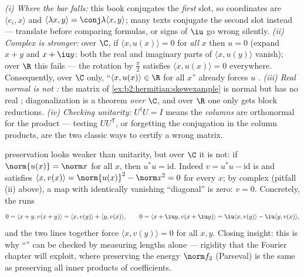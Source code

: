 \begin{remark}
\emph{(i) Where the bar falls:} this book conjugates the
\emph{first} slot, so coordinates are $\langle e_i, x\rangle$
and $\langle\lambda x, y\rangle = \conj\lambda\langle x,
y\rangle$; many texts conjugate the second slot instead ---
translate before comparing formulas, or signs of $\iu$ go
wrong silently. \emph{(ii) Complex  is stronger:}
over $\C$, if $\langle x, u(x)\rangle = 0$ for \emph{all} $x$
then $u = 0$ (expand $x + y$ and $x + \iu y$: both the real
and imaginary parts of $\langle x, u(y)\rangle$ vanish); over
$\R$ this fails --- the rotation by $\frac\pi2$ satisfies
$\langle x, u(x)\rangle = 0$ everywhere. Consequently, over
$\C$ only, ``$\langle x, u(x)\rangle \in \R$ for all $x$''
already forces $u$ . \emph{(iii) Real normal is not
:} the matrix of
\cref{ex:b2:hermitian:skewexample} is normal but has no real
;  diagonalization is a theorem \emph{over}
$\C$, and over $\R$ one only gets block reductions.
\emph{(iv) Checking unitarity:} $U^\dagger U = I$ means the
\emph{columns} are orthonormal for the  product ---
testing $UU^{\mathsf T}$, or forgetting the conjugation in the
column products, are the two classic ways to certify a wrong
matrix.
\end{remark}

\begin{example}\label{ex:b2:hermitian:isometry}
 preservation looks weaker than unitarity, but over $\C$ it
is not: if $\norm{u(x)} = \norm x$ for all $x$, then $u^*u =
\mathrm{id}$. Indeed $v = u^*u - \mathrm{id}$ is  and
satisfies $\langle x, v(x)\rangle = \norm{u(x)}^2 - \norm x^2 =
0$ for every $x$; by complex  (pitfall (ii)
above), a map with identically vanishing ``diagonal'' is zero:
$v = 0$. Concretely, the  runs
\[
0 = \langle x + y, v(x+y)\rangle
= \langle x, v(y)\rangle + \langle y, v(x)\rangle,
\qquad
0 = \langle x + \iu y, v(x + \iu y)\rangle
= \iu\langle x, v(y)\rangle - \iu\langle y, v(x)\rangle ,
\]
and the two lines together force $\langle x, v(y)\rangle = 0$
for all $x, y$. Closing insight: this is why ``'' can
be checked by measuring lengths alone --- rigidity that the
Fourier chapter will exploit, where preserving the energy
$\norm f_2$ (Parseval) is the same as preserving all inner
products of coefficients.
\end{example}

